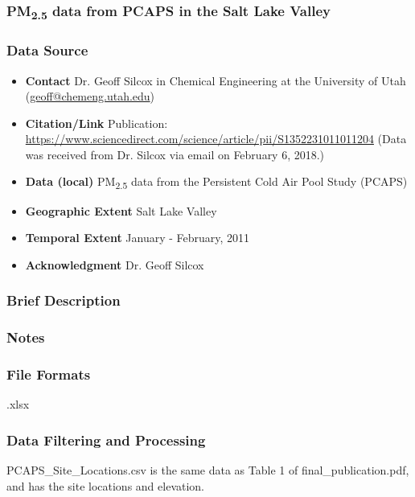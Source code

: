 \subsubsection{\texorpdfstring{PM\textsubscript{2.5}}{} data from PCAPS in the Salt Lake Valley}

\subsubsection*{Data Source}

\begin{itemize}[nolistsep]
\item \textbf{Contact} Dr. Geoff Silcox in Chemical Engineering at the University of Utah (\url{geoff@chemeng.utah.edu})
\item \textbf{Citation/Link} Publication: \url{https://www.sciencedirect.com/science/article/pii/S1352231011011204} \cite{Silcox_wintertime_2012} (Data was received from Dr. Silcox via email on February 6, 2018.)
\item \textbf{Data (local)} PM\textsubscript{2.5} data from the Persistent Cold Air Pool Study (PCAPS)
\item \textbf{Geographic Extent} Salt Lake Valley
\item \textbf{Temporal Extent} January - February, 2011
\item \textbf{Acknowledgment} Dr. Geoff Silcox
\end{itemize}

\subsubsection*{Brief Description}

\subsubsection*{Notes}

\subsubsection*{File Formats} 
.xlsx

\subsubsection*{Data Filtering and Processing}

PCAPS\_Site\_Locations.csv is the same data as Table 1 of final\_publication.pdf, and has the site locations and elevation.

